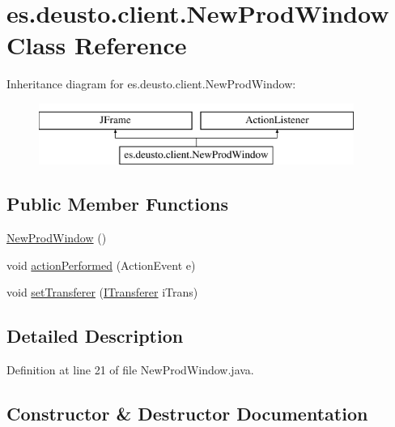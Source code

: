 \hypertarget{classes_1_1deusto_1_1client_1_1_new_prod_window}{}\section{es.\+deusto.\+client.\+New\+Prod\+Window Class Reference}
\label{classes_1_1deusto_1_1client_1_1_new_prod_window}
Inheritance diagram for es.\+deusto.\+client.\+New\+Prod\+Window\+:\begin{figure}[H]
\begin{center}
\leavevmode
\includegraphics[height=2.000000cm]{classes_1_1deusto_1_1client_1_1_new_prod_window}
\end{center}
\end{figure}
\subsection*{Public Member Functions}
\begin{DoxyCompactItemize}
\item 
\hyperlink{classes_1_1deusto_1_1client_1_1_new_prod_window_a07ce756a81d6cf22bfc218ce374a7dfb}{New\+Prod\+Window} ()
\item 
void \hyperlink{classes_1_1deusto_1_1client_1_1_new_prod_window_a55a477c0bf87e25c575b47ffecc34d5f}{action\+Performed} (Action\+Event e)
\item 
void \hyperlink{classes_1_1deusto_1_1client_1_1_new_prod_window_aa254d28487576c4a20e270fa24bdf384}{set\+Transferer} (\hyperlink{interfacees_1_1deusto_1_1server_1_1remote_1_1_i_transferer}{I\+Transferer} i\+Trans)
\end{DoxyCompactItemize}


\subsection{Detailed Description}


Definition at line 21 of file New\+Prod\+Window.\+java.



\subsection{Constructor \& Destructor Documentation}
\mbox{\label{classes_1_1deusto_1_1client_1_1_new_prod_window_a07ce756a81d6cf22bfc218ce374a7dfb}} 
